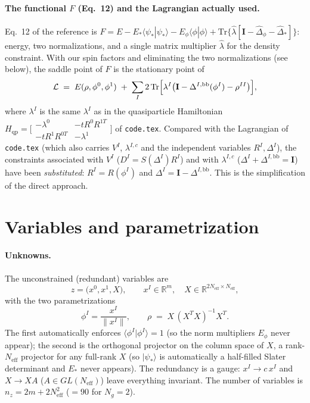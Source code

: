 \documentclass[11pt]{article}
\newcommand{\Neff}{N_{\mathrm{eff}}}
\newcommand{\Ng}{N_{g}}
\newcommand{\Hqp}{H_{\mathrm{qp}}}
\newcommand{\Ybb}{\Delta^{I,\mathrm{bb}}}
\begin{document}
\paragraph{The functional $F$ (Eq.~12) and the Lagrangian actually used.} Eq.~12 of the
reference is $F=E-E_*\langle\psi_*|\psi_*\rangle-E_\phi\langle\phi|\phi\rangle
+\mathrm{Tr}\{\hat\lambda[\mathbf I-\hat\Delta_\phi-\hat\Delta_*]\}$: energy, two
normalizations, and a single matrix multiplier $\hat\lambda$ for the density constraint.
With our spin factors and eliminating the two normalizations (see below), the saddle point
of $F$ is the stationary point of
\begin{equation}
  \mathcal L\;=\;E(\rho,\phi^0,\phi^1)\;+\;\sum_{I}2\,\mathrm{Tr}\Bigl[\lambda^{I}
      \bigl(\mathbf I-\Ybb(\phi^{I})-\rho^{II}\bigr)\Bigr],
  \label{eq:Lni}
\end{equation}
where $\lambda^I$ is the same $\lambda^I$ as in the quasiparticle Hamiltonian
$\Hqp=\bigl[\begin{smallmatrix}-\lambda^0&-tR^0R^{1T}\\-tR^1R^{0T}&-\lambda^1\end{smallmatrix}\bigr]$
of \texttt{code.tex}. Compared with the Lagrangian of \texttt{code.tex} (which also carries
$V^I$, $\lambda^{I,c}$ and the independent variables $R^I,\Delta^I$), the constraints
associated with $V^I$ ($D^I=S(\Delta^I)R^I$) and with $\lambda^{I,c}$
($\Delta^I+\Ybb=\mathbf I$) have been \emph{substituted}: $R^I=R(\phi^I)$ and
$\Delta^I=\mathbf I-\Ybb$. This is the simplification of the direct approach.

\section{Variables and parametrization}
\label{sec:variables}

\paragraph{Unknowns.} The unconstrained (redundant) variables are
\begin{equation}
  z=\bigl(x^{0},x^{1},X\bigr),\qquad
  x^{I}\in\mathbb R^{m},\quad X\in\mathbb R^{2\Neff\times\Neff},
\end{equation}
with the two parametrizations
\begin{equation}
  \phi^{I}=\frac{x^{I}}{\lVert x^{I}\rVert},\qquad
  \rho \;=\; X\,(X^{T}X)^{-1}X^{T}.
  \label{eq:param}
\end{equation}
The first automatically enforces $\langle\phi^I|\phi^I\rangle=1$ (so the norm multipliers
$E_\phi$ never appear); the second is the orthogonal projector on the column space of $X$,
a rank-$\Neff$ projector for any full-rank $X$ (so $|\psi_*\rangle$ is automatically a
half-filled Slater determinant and $E_*$ never appears). The redundancy is a gauge:
$x^I\to c\,x^I$ and $X\to XA$ ($A\in GL(\Neff)$) leave everything invariant. The number of
variables is $n_z=2m+2\Neff^2$ ($=90$ for $\Ng=2$).
\end{document}
